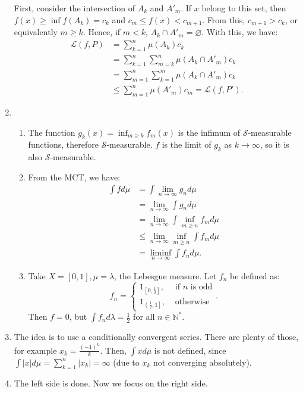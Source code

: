 \begin{enumerate}[label=\textbf{3A.\arabic*}]
    First, consider the intersection of \( A_{k} \) and \( A'_{m} \). If \( x \)
    belong to this set, then \( f(x) \ge \inf f(A_{k}) = c_{k} \) and \( c_{m}
    \le f(x) < c_{m + 1} \). From this, \( c_{m + 1} > c_{k} \), or equivalently
    \( m \ge k \). Hence, if \( m < k \), \( A_{k} \cap A'_{m} = \varnothing \).
    With this, we have:
    \begin{align*}
      \mathcal{L}(f, P) &= \sum_{k = 1}^{n} \mu (A_{k}) c_{k}\\
      &= \sum_{k = 1}^{n} \sum_{m = k}^{n} \mu (A_{k} \cap A'_{m}) c_{k} \\
      &= \sum_{m = 1}^{n} \sum_{k = 1}^{m} \mu (A_{k} \cap A'_{m}) c_{k} \\
      &\le \sum_{m = 1}^{n} \mu (A'_{m})c_{m} = \mathcal{L}(f, P')
    .\end{align*}
  \item \begin{enumerate}[label=(\alph*)]
      \item The function \( g_{k}(x) = \inf_{m \ge k} f_{m}(x) \) is the infimum
        of \( \mathcal{S} \)-measurable functions, therefore \( \mathcal{S}
        \)-measurable. \( f \) is the limit of \( g_{k} \) as \( k \to \infty
        \), so it is also \( \mathcal{S} \)-measurable.
      \item From the MCT, we have:
        \begin{align*}
          \int f d\mu &= \int \lim_{n \to \infty} g_{n} d\mu \\
                      &= \lim_{n \to \infty} \int g_{n}d\mu\\
                      &= \lim_{n \to \infty} \int \inf _{m \ge n} f_{m} d\mu\\
                      &\le \lim_{n \to \infty} \inf _{m \ge n} \int f_{m}d\mu\\
                      &= \liminf_{n \to \infty} \int f_{n}d\mu
        .\end{align*}
      \item Take \( X = [0, 1], \mu = \lambda \), the Lebesgue measure. 
        Let \( f_{n} \) be defined as:
        \[
          f_{n} = \begin{cases}
            1_{\left[ 0, \frac{1}{2} \right] }, &\text{ if } n \text{ is odd}\\
            1_{\left( \frac{1}{2}, 1 \right] }, & \text{ otherwise}
          \end{cases}
        .\] 
        Then \( f = 0 \), but \( \int f_{n}d\lambda = \frac{1}{2} \) for all \(
        n \in \mathbb{N}^{*} \).
  \end{enumerate}
  \item The idea is to use a conditionally convergent series. There are plenty
    of those, for example \( x_{k} = \frac{(-1)^{k}}{k} \). Then, \( \int xd\mu
    \) is not defined, since \( \int |x| d\mu = \sum_{k = 1}^{n} |x_{k}| =
    \infty \) (due to \( x_{k} \) not converging absolutely).
  \item The left side is done. Now we focus on the right side.


\end{enumerate}
